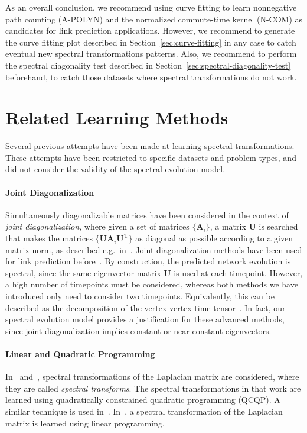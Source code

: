 \documentclass[11pt,a4paper]{book}
\begin{document}
As an overall conclusion, we recommend using curve fitting to learn
nonnegative path counting (\textrm{A-POLYN}) and the normalized
commute-time kernel (\textrm{N-COM}) as candidates for link prediction
applications. 
However, we recommend to generate the curve fitting plot described in
Section~\ref{sec:curve-fitting} in any case to catch eventual new
spectral transformations patterns. 
Also, we recommend to perform the spectral diagonality test described in
Section~\ref{sec:spectral-diagonality-test} beforehand, to catch those
datasets where spectral transformations do not work. 

\section{Related Learning Methods}
\label{sec:spectral-transformation:related}
Several previous attempts have been made at learning spectral
transformations.  These attempts have been restricted to specific
datasets and problem types, and did not consider the validity of the
spectral evolution model. 

\paragraph{Joint Diagonalization}
Simultaneously diagonalizable matrices have been considered in the
context of \emph{joint diagonalization}, where given a set of matrices
$\{\mathbf A_i\}$, a matrix $\mathbf U$ is searched that makes the
matrices $\{\mathbf U\mathbf A_i\mathbf U^{\mathrm T}\}$ as diagonal as possible
according to a given matrix norm, as described e.g.\ in~\cite{b350}.  
Joint diagonalization methods have been used for link
prediction before~\cite{b515}.  
By construction, the predicted network evolution is spectral, since the
same eigenvector matrix $\mathbf U$ is used at each timepoint. 
However, a high number of timepoints must be considered, whereas both
methods we have introduced only need to consider two timepoints. 
Equivalently, this can be described as the decomposition of the
vertex-vertex-time tensor~\cite{spiegel:time-tensor}. 
In fact, our spectral evolution model provides a justification for
these advanced methods, since joint diagonalization implies
constant or near-constant eigenvectors. 

\paragraph{Linear and Quadratic Programming}
In~\cite{b657}
and~\cite{b564},
spectral transformations of the
Laplacian matrix are  
considered, where they are called \emph{spectral transforms}. 
The spectral transformations in that work are learned using
quadratically constrained quadratic programming (QCQP). 
A similar technique is used in~\cite{b464}. 
In~\cite{b636}, a spectral transformation of the Laplacian matrix is
learned using linear programming. 
\end{document}
